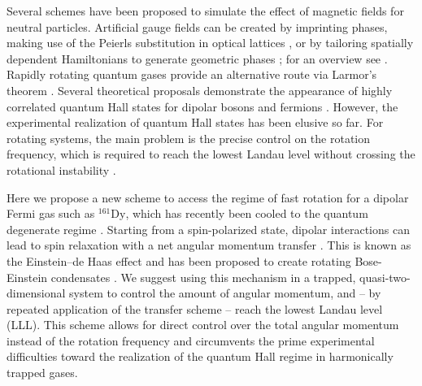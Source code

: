 Several schemes have been proposed to simulate the effect of magnetic fields for neutral particles. Artificial gauge fields can be created by imprinting phases, making use of the Peierls substitution in optical lattices \cite{Aidelsburger2011,Jimenez-Garcia2012,Struck2012}, or by tailoring spatially dependent Hamiltonians to generate geometric phases \cite{Lin2009}; for an overview see \cite{Dalibard2011}. Rapidly rotating quantum gases provide an alternative route via Larmor's theorem
\cite{Cooper2008,Fetter2009}. Several theoretical proposals demonstrate the appearance of highly correlated quantum Hall states for dipolar bosons \cite{Cooper2005} and fermions \cite{Baranov2005,Osterloh2007}. However, the experimental realization of quantum Hall states has been elusive so far. For rotating systems, the main problem is the precise control on the rotation frequency, which is required to reach the lowest Landau level without crossing the rotational instability \cite{Schweikhard2004}.


Here we propose a new scheme to access the regime of fast rotation for a dipolar Fermi gas such as $^{161}\text{Dy}$, which has recently been cooled to the quantum degenerate regime \cite{Lu2012}. Starting from a spin-polarized state, dipolar interactions can lead to spin relaxation with a net angular momentum transfer \cite{Hensler2003}. This is known as the Einstein--de Haas effect \cite{Einstein1915} and has been proposed to create rotating Bose-Einstein condensates \cite{Santos2006,Kawaguchi2006}. We suggest using this mechanism in a trapped, quasi-two-dimensional system to control the amount of angular momentum, and -- by repeated application of the transfer scheme -- reach the lowest Landau level (LLL). This scheme allows for direct control over the total angular momentum instead of the rotation frequency and circumvents the prime experimental difficulties toward the realization of the quantum Hall regime in harmonically trapped gases.






